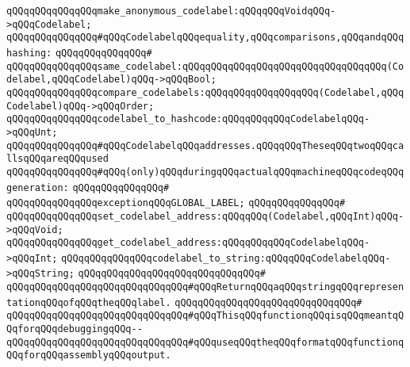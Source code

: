 \newline
\verb|qQQqqQQqqQQqqQQqmake_anonymous_codelabel:qQQqqQQqVoidqQQq->qQQqCodelabel;|\newline
\newline
\verb|qQQqqQQqqQQqqQQq#qQQqCodelabelqQQqequality,qQQqcomparisons,qQQqandqQQqhashing:|\newline
\verb|qQQqqQQqqQQqqQQq#|\newline
\verb|qQQqqQQqqQQqqQQqsame_codelabel:qQQqqQQqqQQqqQQqqQQqqQQqqQQqqQQqqQQq(Codelabel,qQQqCodelabel)qQQq->qQQqBool;|\newline
\verb|qQQqqQQqqQQqqQQqcompare_codelabels:qQQqqQQqqQQqqQQqqQQq(Codelabel,qQQqCodelabel)qQQq->qQQqOrder;|\newline
\verb|qQQqqQQqqQQqqQQqcodelabel_to_hashcode:qQQqqQQqqQQqCodelabelqQQq->qQQqUnt;|\newline
\newline
\newline
\verb|qQQqqQQqqQQqqQQq#qQQqCodelabelqQQqaddresses.qQQqqQQqTheseqQQqtwoqQQqcallsqQQqareqQQqused|\newline
\verb|qQQqqQQqqQQqqQQq#qQQq(only)qQQqduringqQQqactualqQQqmachineqQQqcodeqQQqgeneration:|\newline
\verb|qQQqqQQqqQQqqQQq#|\newline
\verb|qQQqqQQqqQQqqQQqexceptionqQQqGLOBAL_LABEL;|\newline
\verb|qQQqqQQqqQQqqQQq#|\newline
\verb|qQQqqQQqqQQqqQQqset_codelabel_address:qQQqqQQq(Codelabel,qQQqInt)qQQq->qQQqVoid;|\newline
\verb|qQQqqQQqqQQqqQQqget_codelabel_address:qQQqqQQqqQQqCodelabelqQQq->qQQqInt;|\newline
\newline
\newline
\verb|qQQqqQQqqQQqqQQqcodelabel_to_string:qQQqqQQqCodelabelqQQq->qQQqString;|\newline
\verb|qQQqqQQqqQQqqQQqqQQqqQQqqQQqqQQq#|\newline
\verb|qQQqqQQqqQQqqQQqqQQqqQQqqQQqqQQq#qQQqReturnqQQqaqQQqstringqQQqrepresentationqQQqofqQQqtheqQQqlabel.|\newline
\verb|qQQqqQQqqQQqqQQqqQQqqQQqqQQqqQQq#|\newline
\verb|qQQqqQQqqQQqqQQqqQQqqQQqqQQqqQQq#qQQqThisqQQqfunctionqQQqisqQQqmeantqQQqforqQQqdebuggingqQQq--|\newline
\verb|qQQqqQQqqQQqqQQqqQQqqQQqqQQqqQQq#qQQquseqQQqtheqQQqformatqQQqfunctionqQQqforqQQqassemblyqQQqoutput.|\newline
